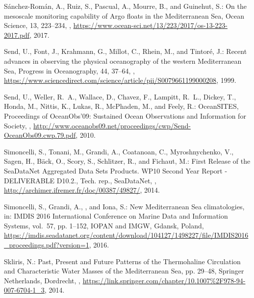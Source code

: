 \documentclass[essd]{copernicus}
\begin{document}
\begin{thebibliography}{46}
S\'{a}nchez-Rom\'{a}n, A., Ruiz, S., Pascual, A., Mourre, B., and Guinehut, S.:
  {On the mesoscale monitoring capability of Argo floats in the Mediterranean
  Sea}, Ocean Science, 13, 223–234, ,
  \urlprefix\url{https://www.ocean-sci.net/13/223/2017/os-13-223-2017.pdf},
  2017.

Send, U., Font, J., Krahmann, G., Millot, C., Rhein, M., and Tintor\'{e}, J.:
  {Recent advances in observing the physical oceanography of the western
  Mediterranean Sea}, Progress in Oceanography, 44, 37–64,
  ,
  \urlprefix\url{https://www.sciencedirect.com/science/article/pii/S0079661199000208},
  1999.

Send, U., Weller, R.~A., Wallace, D., Chavez, F., Lampitt, R.~L., Dickey, T.,
  Honda, M., Nittis, K., Lukas, R., {McPhaden}, M., and Feely, R.:
  {OceanSITES}, Proceedings of OceanObs’09: Sustained Ocean Observations and
  Information for Society, ,
  \urlprefix\url{http://www.oceanobs09.net/proceedings/cwp/Send-OceanObs09.cwp.79.pdf},
  2010.

Simoncelli, S., Tonani, M., Grandi, A., Coatanoan, C., Myroshnychenko, V.,
  Sagen, H., B\"{a}ck, O., Scory, S., Schlitzer, R., and Fichaut, M.: {First
  Release of the SeaDataNet Aggregated Data Sets Products. WP10 Second Year
  Report - DELIVERABLE D10.2.}, Tech. rep., SeaDataNet, ,
  \urlprefix\url{http://archimer.ifremer.fr/doc/00387/49827/}, 2014.

Simoncelli, S., Grandi, A., , and Iona, S.: {New Mediterranean Sea
  climatologies}, in: {IMDIS 2016 International Conference on Marine Data and
  Information Systems}, vol.~57, pp. 1--152, IOPAN and IMGW, Gdansk, Poland,
  \urlprefix\url{https://imdis.seadatanet.org/content/download/104127/1498227/file/IMDIS2016_proceedings.pdf?version=1},
  2016.

Skliris, N.: {Past, Present and Future Patterns of the Thermohaline Circulation
  and Characteristic Water Masses of the Mediterranean Sea}, pp. 29--48,
  Springer Netherlands, Dordrecht, ,
  \urlprefix\url{https://link.springer.com/chapter/10.1007%2F978-94-007-6704-1_3},
  2014.


\end{thebibliography}
\end{document}

